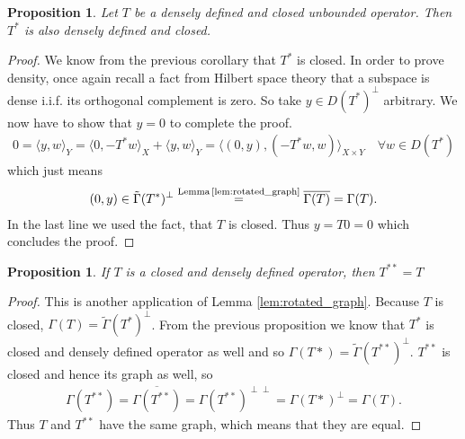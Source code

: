 \documentclass[12pt,a4paper]{article}
\numberwithin{equation}{subsection}
\numberwithin{lemma}{subsection}
\newtheorem{proposition}[lemma]{Proposition}
\theoremstyle{definition}
\begin{document}
\begin{proposition}\label{prop:adjoint_of_densely_defined_closed}
    Let $T$ be a densely defined and closed unbounded operator.
    Then $T^*$ is also densely defined and closed.
\end{proposition}
\begin{proof}
    We know from the previous corollary that $T^*$ is closed. 
    In order to prove density, once again recall a fact from Hilbert space
    theory that a subspace is dense i.i.f. its orthogonal complement 
    is zero. So take $y \in D(T^*)^\perp$ arbitrary. We now have to show that 
    $y=0$ to complete the proof.
    \begin{align*}
        0 = \langle y, w \rangle_Y 
        = \langle 0, -T^*w \rangle _X + \langle y, w \rangle _Y
        = \langle (0,y), (-T^*w,w) \rangle _{X\times Y} \quad \forall w \in D(T^*)
    \end{align*}
    which just means
    \begin{align*}
        (0,y) \in \tilde{\Gamma}(T^*)^\perp 
        \stackrel{\text{Lemma\,\ref{lem:rotated_graph}} }{=} \overline{\Gamma(T)}
        = \Gamma(T).
    \end{align*}
    In the last line we used the fact, that $T$ is closed. 
    Thus $y = T0 = 0$ which concludes the proof.
\end{proof}

\begin{proposition}\label{prop:T_starstar_equals_T}
    If $T$ is a closed and densely defined operator, 
    then $T^{**} = T$
\end{proposition}
\begin{proof}
    This is another application of Lemma \ref{lem:rotated_graph}. 
    Because $T$ is closed, $\Gamma(T) = \tilde{\Gamma}(T^*)^\perp$. 
    From the previous proposition we know that $T^*$ is closed and 
    densely defined operator as well and so $\Gamma(T*) = \tilde{\Gamma}(T^{**})^\perp$.
    $T^{**}$ is closed and hence its graph as well, so
    \begin{align*}
        \Gamma(T^{**}) = \overline{\Gamma(T^{**})} 
        = \Gamma(T^{**})^{\perp \perp} = \Gamma(T*)^\perp 
        = \Gamma(T).
    \end{align*}
    Thus $T$ and $T^{**}$ have the same graph, which means that they are equal.
\end{proof}
\end{document}
